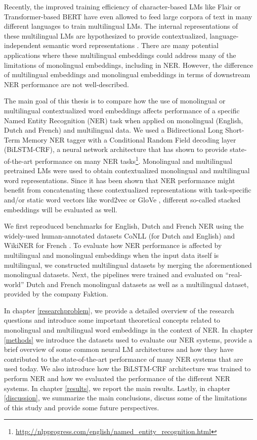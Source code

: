 \documentclass[12pt,a4paper,]{book}
\begin{document}
Recently, the improved training efficiency of character-based LMs like Flair \citep{akbik2018} or Transformer-based BERT \citep{devlin2019} have even allowed to feed large corpora of text in many different languages to train multilingual LMs. The internal representations of these multilingual LMs are hypothesized to provide contextualized, language-independent semantic word representations \citep{pires2019}. There are many potential applications where these multilingual embeddings could address many of the limitations of monolingual embeddings, including in NER. However, the difference of multilingual embeddings and monolingual embeddings in terms of downstream NER performance are not well-described.

The main goal of this thesis is to compare how the use of monolingual or multilingual contextualized word embeddings affects performance of a specific Named Entity Recognition (NER) task when applied on monolingual (English, Dutch and French) and multilingual data. We used a Bidirectional Long Short-Term Memory NER tagger with a Conditional Random Field decoding layer (BiLSTM-CRF), a neural network architecture that has shown to provide state-of-the-art performance on many NER tasks\footnote{\url{http://nlpprogress.com/english/named_entity_recognition.html}}. Monolingual and multilingual pretrained LMs were used to obtain contextualized monolingual and multilingual word representations. Since it has been shown that NER performance might benefit from concatenating these contextualized representations with task-specific \citep{lample2016} and/or static word vectors like word2vec \citep{mikolov2013} or GloVe \citep{pennington2014}, different so-called stacked embeddings will be evaluated as well.

We first reproduced benchmarks for English, Dutch and French NER using the widely-used human-annotated datasets CoNLL \citep{tjongkimsang2002, tjongkimsang2003} (for Dutch and English) and WikiNER for French \citep{nothman2013}. To evaluate how NER performance is affected by multilingual and monolingual embeddings when the input data itself is multilingual, we constructed multilingual datasets by merging the aforementioned monolingual datasets. Next, the pipelines were trained and evaluated on ``real-world'' Dutch and French monolingual datasets as well as a multilingual dataset, provided by the company Faktion.

In chapter \ref{researchproblem}, we provide a detailed overview of the research questions and introduce some important theoretical concepts related to monolingual and multilingual word embeddings in the context of NER. In chapter \ref{methods} we introduce the datasets used to evaluate our NER systems, provide a brief overview of some common neural LM architectures and how they have contributed to the state-of-the-art performance of many NER systems that are used today. We also introduce how the BiLSTM-CRF architecture was trained to perform NER and how we evaluated the performance of the different NER systems. In chapter \ref{results}, we report the main results. Lastly, in chapter \ref{discussion}, we summarize the main conclusions, discuss some of the limitations of this study and provide some future perspectives.
\end{document}
